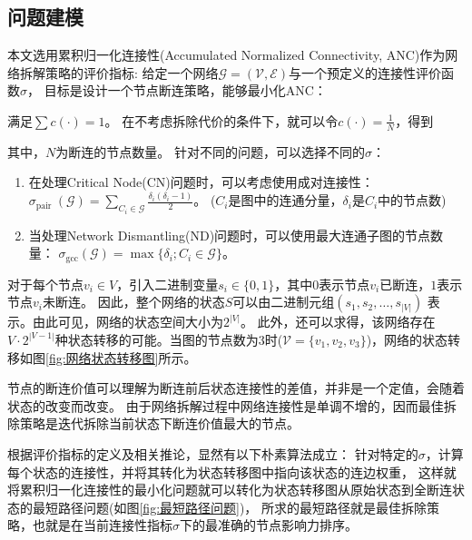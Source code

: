 \documentclass[twocolumn]{morningstar}
\begin{document}
\subsection{问题建模}\label{sec:ProblemFormulation}

本文选用累积归一化连接性(Accumulated Normalized Connectivity, ANC)作为网络拆解策略的评价指标\cite{schneider2011ANC}: 
给定一个网络$\mathcal{G}=(\mathcal{V},\mathcal{E})$与一个预定义的连接性评价函数$\sigma$，
目标是设计一个节点断连策略，能够最小化ANC：


\noindent 满足$\sum c(\cdot) = 1$。
在不考虑拆除代价的条件下，就可以令$c(\cdot) = \frac{1}{N}$，得到


\noindent 其中，$N$为断连的节点数量。
针对不同的问题，可以选择不同的$\sigma$：

\begin{enumerate}[leftmargin=1em]
    \item 在处理Critical Node(CN)问题\cite{arulselvan2009恐怖分子网络_CN}时，可以考虑使用成对连接性：
    $\sigma_{\text {pair }}(\mathcal{G})=\sum_{C_i \in \mathcal{G}} \frac{\delta_i(\delta_i-1)}{2}$。
    ($C_i$是图中的连通分量，$\delta_i$是$C_i$中的节点数)
    \item 当处理Network Dismantling(ND)问题\cite{braunstein2016ND}时，可以使用最大连通子图的节点数量：
    $\sigma_{\mathrm{gcc}}(\mathcal{G})=\max \{\delta_i ; C_i \in \mathcal{G}\}$。
\end{enumerate}

对于每个节点$v_i \in V$，引入二进制变量$s_i \in \{0,1\}$，其中$0$表示节点$v_i$已断连，$1$表示节点$v_i$未断连。
因此，整个网络的状态$S$可以由二进制元组$(s_1, s_2, \ldots, s_{|V|})$ 表示。由此可见，网络的状态空间大小为$2^{|V|}$。
此外，还可以求得，该网络存在$V\cdot2^{|V-1|}$种状态转移的可能。当图的节点数为3时($\mathcal{V} = \{v_1, v_2, v_3\}$)，网络的状态转移如图\ref{fig:网络状态转移图}所示。



节点的断连价值可以理解为断连前后状态连接性的差值，并非是一个定值，会随着状态的改变而改变。
由于网络拆解过程中网络连接性是单调不增的，因而最佳拆除策略是迭代拆除当前状态下断连价值最大的节点。



根据评价指标的定义及相关推论，显然有以下朴素算法成立：
针对特定的$\sigma$，计算每个状态的连接性，并将其转化为状态转移图中指向该状态的连边权重，
这样就将累积归一化连接性的最小化问题就可以转化为状态转移图从原始状态到全断连状态的最短路径问题(如图\ref{fig:最短路径问题})，
所求的最短路径就是最佳拆除策略，也就是在当前连接性指标$\sigma$下的最准确的节点影响力排序。
\end{document}
